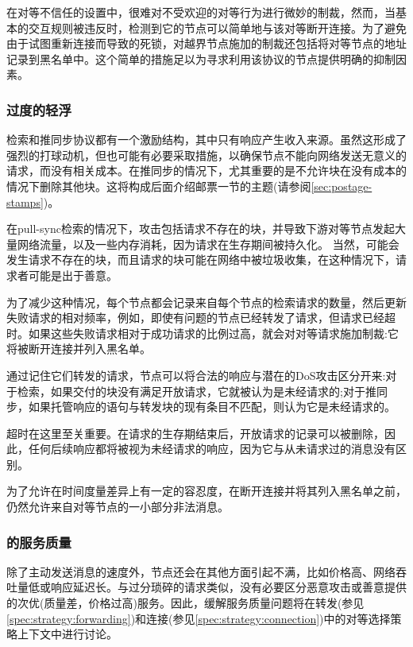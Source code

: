 在对等不信任的设置中，很难对不受欢迎的对等行为进行微妙的制裁，然而，当基本的交互规则被违反时，检测到它的节点可以简单地与该对等断开连接。为了避免由于试图重新连接而导致的死锁，对越界节点施加的制裁还包括将对等节点的地址记录到黑名单中。这个简单的措施足以为寻求利用该协议的节点提供明确的抑制因素。 

\subsubsection{过度的轻浮}

检索和推同步协议都有一个激励结构，其中只有响应产生收入来源。虽然这形成了强烈的打球动机，但也可能有必要采取措施，以确保节点不能向网络发送无意义的请求，而没有相关成本。在推同步的情况下，尤其重要的是不允许块在没有成本的情况下删除其他块。这将构成后面介绍邮票一节的主题(请参阅\ref{sec:postage-stamps})。

在pull-sync检索的情况下，攻击包括请求不存在的块，并导致下游对等节点发起大量网络流量，以及一些内存消耗，因为请求在生存期间被持久化。
当然，可能会发生请求不存在的块，而且请求的块可能在网络中被垃圾收集，在这种情况下，请求者可能是出于善意。

为了减少这种情况，每个节点都会记录来自每个节点的检索请求的数量，然后更新失败请求的相对频率，例如，即使有问题的节点已经转发了请求，但请求已经超时。如果这些失败请求相对于成功请求的比例过高，就会对对等请求施加制裁:它将被断开连接并列入黑名单。

% 
%

通过记住它们转发的请求，节点可以将合法的响应与潜在的DoS攻击区分开来:对于检索，如果交付的块没有满足开放请求，它就被认为是未经请求的;对于推同步，如果托管响应的语句与转发块的现有条目不匹配，则认为它是未经请求的。

超时在这里至关重要。在请求的生存期结束后，开放请求的记录可以被删除，因此，任何后续响应都将被视为未经请求的响应，因为它与从未请求过的消息没有区别。

为了允许在时间度量差异上有一定的容忍度，在断开连接并将其列入黑名单之前，仍然允许来自对等节点的一小部分非法消息。

\subsubsection{的服务质量}

除了主动发送消息的速度外，节点还会在其他方面引起不满，比如价格高、网络吞吐量低或响应延迟长。与过分琐碎的请求类似，没有必要区分恶意攻击或善意提供的次优(质量差，价格过高)服务。因此，缓解服务质量问题将在转发(参见\ref{spec:strategy:forwarding})和连接(参见\ref{spec:strategy:connection})中的对等选择策略上下文中进行讨论。

